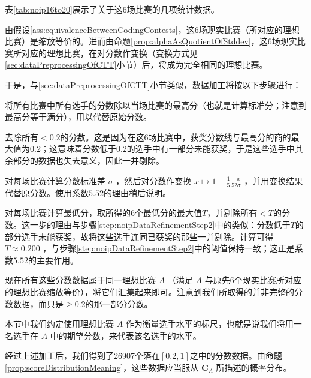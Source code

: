         表\ref{tab:noip16to20}展示了关于这6场比赛的几项统计数据。

        \vspace{1.5ex}

        由假设\ref{ass:equivalenceBetweenCodingContests}，这6场现实比赛（所对应的理想比赛）是缩放等价的。进而由命题\ref{prop:alphaAsQuotientOfStddev}，这6场现实比赛所对应的理想比赛，在对分数作变换（变换方式见\ref{sec:dataPreprocessingOfCTT}小节）后，将成为完全相同的理想比赛。

        于是，与\ref{sec:dataPreprocessingOfCTT}小节类似，数据加工将按以下步骤进行：
        \begin{asparaenum}[\bfseries{步骤} 1.]
            \item 将所有比赛中所有选手的分数除以当场比赛的最高分（也就是计算标准分；注意到最高分等于满分），用以代替原始分数。
            \item \label{step:noipDataRefinementStep2} 去除所有$<0.2$的分数。这是因为在这6场比赛中，获奖分数线与最高分的商的最大值为$0.2$；这意味着分数低于$0.2$的选手中有一部分未能获奖，于是这些选手中其余部分的数据也失去意义，因此一并剔除。
            \item 对每场比赛计算分数标准差 $\sigma$ ，然后对分数作变换 $x\mapsto 1-\frac{1-x}{5.52\sigma}$ ，并用变换结果代替原分数。使用系数$5.52$的理由稍后说明。
            \item 对每场比赛计算最低分，取所得的6个最低分的最大值$T$，并剔除所有$<T$的分数。这一步的理由与步骤\ref{step:noipDataRefinementStep2}中的类似：分数低于$T$的部分选手未能获奖，故将这些选手连同已获奖的那些一并剔除。计算可得 $T\approx 0.200$ ，与步骤\ref{step:noipDataRefinementStep2}中的阈值保持一致；这正是系数$5.52$的主要作用。
            \item 现在所有这些分数数据属于同一理想比赛 $A$ （满足 $A$ 与原先6个现实比赛所对应的理想比赛缩放等价），将它们汇集起来即可。注意到我们所取得的并非完整的分数数据，而只是$\geq 0.2$的那一部分分数。
        \end{asparaenum}

        \vspace{1.5ex}

        本节中我们约定使用理想比赛 $A$ 作为衡量选手水平的标尺，也就是说我们将用一名选手在 $A$ 中的期望分数，来代表该名选手的水平。

        \vspace{1.5ex}

        经过上述加工后，我们得到了26907个落在$[0.2,1]$之中的分数数据。由命题\ref{prop:scoreDistributionMeaning}，这些数据应当服从 $\bm{C}_A$ 所描述的概率分布。
        
